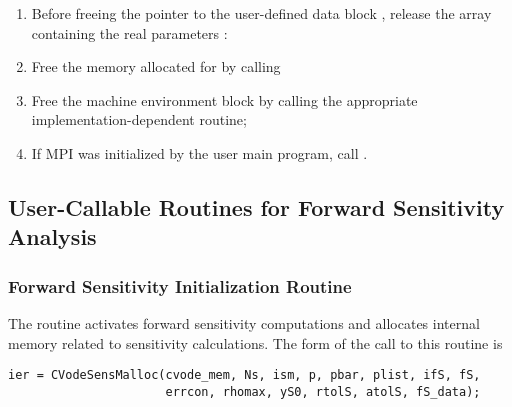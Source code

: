 \begin{enumerate}
  
\item
  Before freeing the pointer to the user-defined data block 
  , release the array containing the real parameters :
  
\item 
  Free the memory allocated for {\cvodes} by calling 
  
\item 
  Free the machine environment block by calling the appropriate {\nvector}
  implementation-dependent routine;
  
\item
  {\p} If MPI was initialized by the user main program, call .
  
\end{enumerate}

\subsection{User-Callable Routines for Forward Sensitivity Analysis}

\subsubsection{Forward Sensitivity Initialization Routine}\label{sss:cvodesensmalloc}

The routine  activates forward sensitivity computations and
allocates internal memory related to sensitivity calculations.
The form of the call to this routine is
\begin{verbatim}
ier = CVodeSensMalloc(cvode_mem, Ns, ism, p, pbar, plist, ifS, fS,
                      errcon, rhomax, yS0, rtolS, atolS, fS_data);
\end{verbatim}

